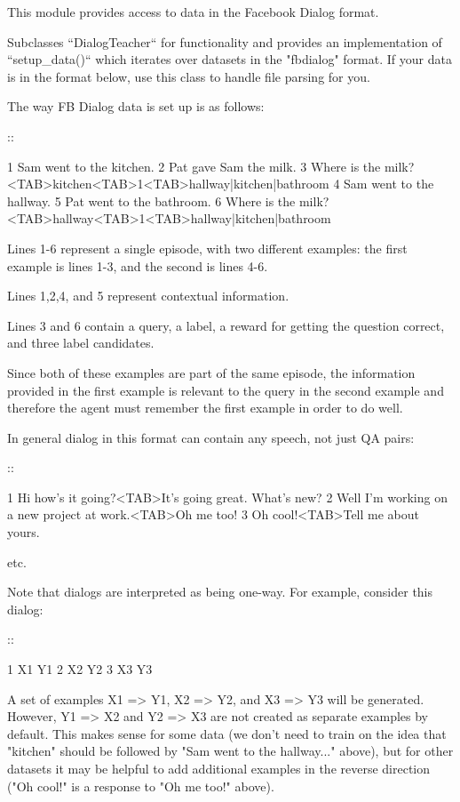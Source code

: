 \begin{DoxyVerb}This module provides access to data in the Facebook Dialog format.

Subclasses ``DialogTeacher`` for functionality and provides an
implementation of ``setup_data()`` which iterates over datasets in the
"fbdialog" format. If your data is in the format below, use this class to
handle file parsing for you.

The way FB Dialog data is set up is as follows:

::

    1 Sam went to the kitchen.
    2 Pat gave Sam the milk.
    3 Where is the milk?<TAB>kitchen<TAB>1<TAB>hallway|kitchen|bathroom
    4 Sam went to the hallway.
    5 Pat went to the bathroom.
    6 Where is the milk?<TAB>hallway<TAB>1<TAB>hallway|kitchen|bathroom

Lines 1-6 represent a single episode, with two different examples: the
first example is lines 1-3, and the second is lines 4-6.

Lines 1,2,4, and 5 represent contextual information.

Lines 3 and 6 contain a query, a label, a reward for getting the question
correct, and three label candidates.

Since both of these examples are part of the same episode, the information
provided in the first example is relevant to the query in the second
example and therefore the agent must remember the first example in order to
do well.

In general dialog in this format can contain any speech, not just QA pairs:

::

    1 Hi how's it going?<TAB>It's going great. What's new?
    2 Well I'm working on a new project at work.<TAB>Oh me too!
    3 Oh cool!<TAB>Tell me about yours.

etc.

Note that dialogs are interpreted as being one-way. For example, consider
this dialog:

::

    1 X1    Y1
    2 X2    Y2
    3 X3    Y3

A set of examples X1 => Y1, X2 => Y2, and X3 => Y3 will be generated.
However, Y1 => X2 and Y2 => X3 are not created as separate examples by
default. This makes sense for some data (we don't need to train on the idea
that "kitchen" should be followed by "Sam went to the hallway..." above),
but for other datasets it may be helpful to add additional examples in the
reverse direction ("Oh cool!" is a response to "Oh me too!" above).
\end{DoxyVerb}
 

